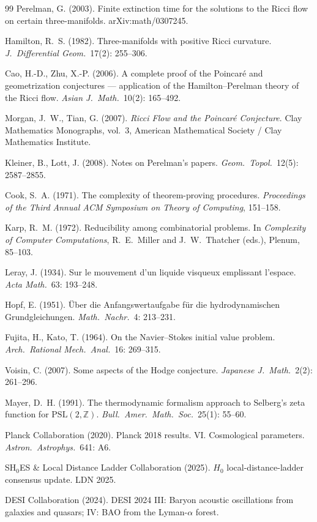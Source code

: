 \documentclass[11pt,a4paper]{article}
\theoremstyle{plain}
\theoremstyle{definition}
\begin{document}
\begin{thebibliography}{99}
Perelman, G. (2003). Finite extinction time for the solutions to
the Ricci flow on certain three-manifolds. arXiv:math/0307245.

Hamilton, R.~S. (1982). Three-manifolds with positive Ricci
curvature. \emph{J.\ Differential Geom.}\ 17(2): 255--306.

Cao, H.-D., Zhu, X.-P. (2006). A complete proof of the Poincar\'e
and geometrization conjectures --- application of the
Hamilton--Perelman theory of the Ricci flow.
\emph{Asian J.\ Math.}\ 10(2): 165--492.

Morgan, J.~W., Tian, G. (2007). \emph{Ricci Flow and the Poincar\'e
Conjecture}. Clay Mathematics Monographs, vol.~3, American
Mathematical Society / Clay Mathematics Institute.

Kleiner, B., Lott, J. (2008). Notes on Perelman's papers.
\emph{Geom.\ Topol.}\ 12(5): 2587--2855.

Cook, S.~A. (1971). The complexity of theorem-proving procedures.
\emph{Proceedings of the Third Annual ACM Symposium on Theory of
Computing}, 151--158.

Karp, R.~M. (1972). Reducibility among combinatorial problems.
In \emph{Complexity of Computer Computations}, R.~E.\ Miller and
J.~W.\ Thatcher (eds.), Plenum, 85--103.

Leray, J. (1934). Sur le mouvement d'un liquide visqueux
emplissant l'espace. \emph{Acta Math.}\ 63: 193--248.

Hopf, E. (1951). \"Uber die Anfangswertaufgabe f\"ur die
hydrodynamischen Grundgleichungen.
\emph{Math.\ Nachr.}\ 4: 213--231.

Fujita, H., Kato, T. (1964). On the Navier--Stokes initial value
problem. \emph{Arch.\ Rational Mech.\ Anal.}\ 16: 269--315.

Voisin, C. (2007). Some aspects of the Hodge conjecture.
\emph{Japanese J.\ Math.}\ 2(2): 261--296.

Mayer, D.~H. (1991). The thermodynamic formalism approach to
Selberg's zeta function for $\mathrm{PSL}(2, \mathbb{Z})$.
\emph{Bull.\ Amer.\ Math.\ Soc.}\ 25(1): 55--60.

Planck Collaboration (2020). Planck 2018 results. VI. Cosmological
parameters. \emph{Astron.\ Astrophys.}\ 641: A6.

SH$_{0}$ES \& Local Distance Ladder Collaboration (2025). $H_{0}$
local-distance-ladder consensus update. LDN 2025.

DESI Collaboration (2024). DESI 2024 III: Baryon acoustic
oscillations from galaxies and quasars; IV: BAO from the
Lyman-$\alpha$ forest.

\end{thebibliography}
\end{document}
